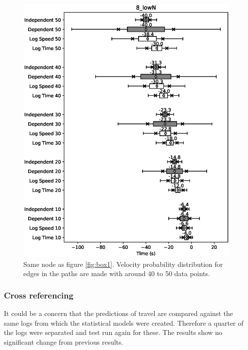 \documentclass{article}
\begin{document}
				\begin{figure}[H]
					\includegraphics[scale=0.7]{8_lowN.eps}
					\caption{Same node as figure \ref{fig:box1}. Velocity probability distribution for edges in the paths are made with around 40 to 50 data points.}
					\label{fig:lowN1}
				\end{figure}

			\subsubsection{Cross referencing}
				It could be a concern that the predictions of travel are compared against the same logs from which the statistical models were created. Therefore a quarter of the logs were separated and test run again for these. The results show no significant change from previous results.
\end{document}
